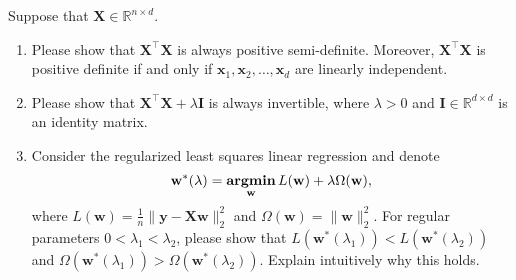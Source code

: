 \documentclass[11pt,letter,notitlepage]{article}
\DeclareMathOperator*{\argmin}{\bf argmin}
\theoremstyle{definition}
\begin{document}
	\newpage
	
	
	
	
	
	\begin{exercise}
		Suppose that $\mathbf{X}\in \mathbb{R}^{n\times d}$.
		\begin{enumerate}
			\item Please show that $\mathbf{X}^{\top}\mathbf{X}$ is always positive semi-definite. Moreover, $\mathbf{X}^{\top}\mathbf{X}$ is positive definite if and only if $\mathbf{x}_1, \mathbf{x}_2, \dots, \mathbf{x}_d$ are linearly independent.
			\item Please show that $\mathbf{X}^{\top}\mathbf{X} + \lambda \mathbf{I}$ is always invertible, where $\lambda>0$ and $\mathbf{I}\in \mathbb{R}^{d\times d}$ is an identity matrix.  
			\item Consider the regularized least squares linear regression and denote
			$$
			\mathbf{w}^*(\lambda)=\argmin_\mathbf{w} L(\mathbf{w})+\lambda \Omega(\mathbf{w}),
			$$
			where $L(\mathbf{w})=\frac{1}{n}\|\mathbf{y}-\mathbf{Xw}\|_2^2$ and $\Omega(\mathbf{w})=\|\mathbf{w}\|_2^2$. For regular parameters $0<\lambda_1<\lambda_2$, please show that $L(\mathbf{w}^*(\lambda_1)) < L(\mathbf{w}^*(\lambda_2))$ and $\Omega (\mathbf{w}^*(\lambda_1)) > \Omega (\mathbf{w}^*(\lambda_2))$. Explain intuitively why this holds.
		\end{enumerate}
		
		
	\end{exercise}
	
	\begin{solution}
		
	\end{solution}

	
	\newpage
	\newpage
    
    
	
\end{document}
